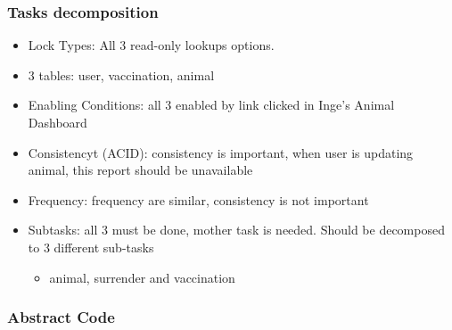 \documentclass[a4paper]{article}
\begin{document}
\subsubsection*{Tasks decomposition}
\begin{itemize}
	\item Lock Types: All 3 read-only lookups options.
	\item 3 tables: user, vaccination, animal
    \item Enabling Conditions: all 3 enabled by link clicked in Inge's Animal Dashboard
    \item Consistencyt (ACID): consistency is important, when user is updating animal, this report should be unavailable
    \item Frequency: frequency are similar, consistency is not important
    \item Subtasks: all 3 must be done, mother task is needed. Should be decomposed to 3 different sub-tasks

    \begin{itemize}

        \item animal, surrender and vaccination


    \end{itemize}

\end{itemize}
\subsubsection*{Abstract Code}
\end{document}
